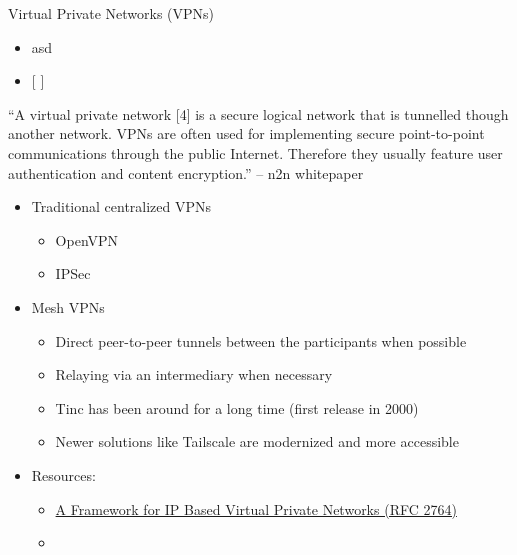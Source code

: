 \label{notes__02050-vpns.md}
\begin{block}{Virtual Private Networks (VPNs)}
\label{notes__02050-vpns.md__virtual-private-networks-vpns}
\begin{itemize}
\item
  asd
\item
  {[} {]}
\end{itemize}

``A virtual private network {[}4{]} is a secure logical network that is tunnelled though
another network. VPNs are often used for implementing secure point-to-point
communications through the public Internet. Therefore they usually feature user
authentication and content encryption.'' -- n2n whitepaper

\begin{itemize}
\item
  Traditional centralized VPNs

  \begin{itemize}
  \tightlist
  \item
    OpenVPN
  \item
    IPSec
  \end{itemize}
\item
  Mesh VPNs

  \begin{itemize}
  \tightlist
  \item
    Direct peer-to-peer tunnels between the participants when possible
  \item
    Relaying via an intermediary when necessary
  \item
    Tinc has been around for a long time (first release in 2000)
  \item
    Newer solutions like Tailscale are modernized and more accessible
  \end{itemize}
\item
  Resources:

  \begin{itemize}
  \tightlist
  \item
    \href{https://www.rfc-editor.org/rfc/rfc2764.html}{A Framework for IP Based Virtual Private Networks (RFC 2764)}
  \item
  \end{itemize}
\end{itemize}
\end{block}

